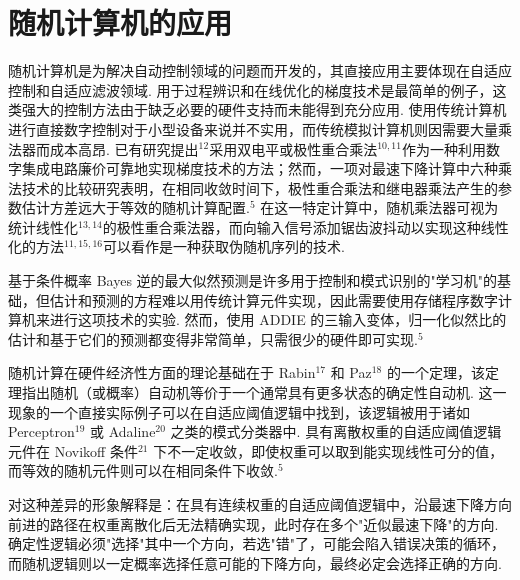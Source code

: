 \section{随机计算机的应用}

随机计算机是为解决自动控制领域的问题而开发的，其直接应用主要体现在自适应控制和自适应滤波领域. 用于过程辨识和在线优化的梯度技术是最简单的例子，这类强大的控制方法由于缺乏必要的硬件支持而未能得到充分应用. 使用传统计算机进行直接数字控制对于小型设备来说并不实用，而传统模拟计算机则因需要大量乘法器而成本高昂. 已有研究提出\(^{12}\)采用双电平或极性重合乘法\(^{10,11}\)作为一种利用数字集成电路廉价可靠地实现梯度技术的方法；然而，一项对最速下降计算中六种乘法技术的比较研究表明，在相同收敛时间下，极性重合乘法和继电器乘法产生的参数估计方差远大于等效的随机计算配置.\(^{5}\) 在这一特定计算中，随机乘法器可视为统计线性化\(^{13,14}\)的极性重合乘法器，而向输入信号添加锯齿波抖动以实现这种线性化的方法\(^{11,15,16}\)可以看作是一种获取伪随机序列的技术.

基于条件概率 Bayes 逆的最大似然预测是许多用于控制和模式识别的"学习机"的基础，但估计和预测的方程难以用传统计算元件实现，因此需要使用存储程序数字计算机来进行这项技术的实验. 然而，使用 ADDIE 的三输入变体，归一化似然比的估计和基于它们的预测都变得非常简单，只需很少的硬件即可实现.\(^{5}\)

随机计算在硬件经济性方面的理论基础在于 Rabin\(^{17}\) 和 Paz\(^{18}\) 的一个定理，该定理指出随机（或概率）自动机等价于一个通常具有更多状态的确定性自动机. 这一现象的一个直接实际例子可以在自适应阈值逻辑中找到，该逻辑被用于诸如 Perceptron\(^{19}\) 或 Adaline\(^{20}\) 之类的模式分类器中. 具有离散权重的自适应阈值逻辑元件在 Novikoff 条件\(^{21}\) 下不一定收敛，即使权重可以取到能实现线性可分的值，而等效的随机元件则可以在相同条件下收敛.\(^{5}\)

对这种差异的形象解释是：在具有连续权重的自适应阈值逻辑中，沿最速下降方向前进的路径在权重离散化后无法精确实现，此时存在多个"近似最速下降"的方向. 确定性逻辑必须"选择"其中一个方向，若选"错"了，可能会陷入错误决策的循环，而随机逻辑则以一定概率选择任意可能的下降方向，最终必定会选择正确的方向.
